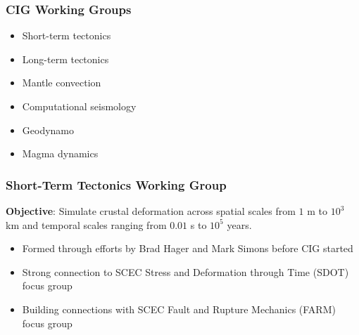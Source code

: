\documentclass{beamer}
\begin{document}
\begin{frame}
  \frametitle{CIG Working Groups}
 
 \begin{itemize}
 \item Short-term tectonics
 \item Long-term tectonics
 \item Mantle convection
 \item Computational seismology
 \item Geodynamo
 \item Magma dynamics
 \end{itemize}

\end{frame}


\begin{frame}
  \frametitle{Short-Term Tectonics Working Group}
  \summary{}
 
 \vfill
 
 \textbf{Objective}: Simulate crustal deformation across spatial
 scales from $1$ m to $10^3$ km and temporal scales ranging from
 $0.01$ s to $10^5$ years.

 \vfill
 \begin{itemize}
 \item Formed through efforts by Brad Hager and Mark Simons before CIG started
 \item Strong connection to SCEC Stress and Deformation through Time
   (SDOT) focus group
 \item Building connections with SCEC Fault and Rupture Mechanics
   (FARM) focus group
 \end{itemize}
\vfill

\end{frame} 
\end{document}

